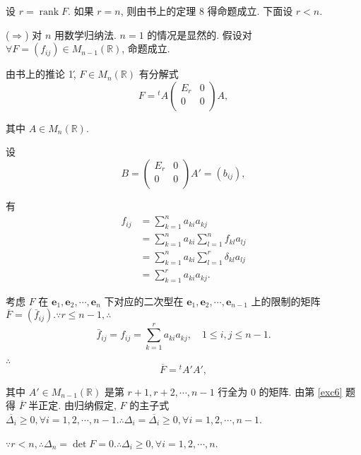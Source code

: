 \documentclass{ctexart}
\begin{document}
\begin{solution}
    设 $r=\operatorname{rank}F$. 如果 $r=n$, 则由书上的定理 8 得命题成立. 下面设 $r<n$.

    ($\Rightarrow$) 对 $n$ 用数学归纳法. $n=1$ 的情况是显然的. 假设对 $\forall F=(f_{ij})\in M_{n-1}(\mathbb{R})$, 命题成立.
    
    由书上的推论 1\', $F\in M_n(\mathbb{R})$ 有分解式
    \[F={}^tA\begin{pmatrix}
        E_r & 0 \\
        0 & 0 \\
    \end{pmatrix}A,\]

    其中 $A\in M_n(\mathbb{R})$.
    
    设
    \[B=\begin{pmatrix}
        E_r & 0 \\
        0 & 0 \\
    \end{pmatrix}A'=(b_{ij}),\]
    
    有
    \begin{align*}
        f_{ij} & =\sum\limits_{k=1}^na_{ki}a_{kj} \\
        & =\sum\limits_{k=1}^na_{ki}\sum\limits_{l=1}^nf_{kl}a_{lj} \\
        & =\sum\limits_{k=1}^na_{ki}\sum\limits_{l=1}^r\delta_{kl}a_{lj} \\
        & =\sum\limits_{k=1}^ra_{ki}a_{kj}.
    \end{align*}

    考虑 $F$ 在 $\boldsymbol{e}_1,\boldsymbol{e}_2,\cdots,\boldsymbol{e}_n$ 下对应的二次型在 $\boldsymbol{e}_1,\boldsymbol{e}_2,\cdots,\boldsymbol{e}_{n-1}$ 上的限制的矩阵 $\overline{F}=(\bar{f}_{ij}).\because r\leq n-1,\therefore$
    \[\bar{f}_{ij}=f_{ij}=\sum\limits_{k=1}^ra_{ki}a_{kj},\quad1\leq i,j\leq n-1.\]

    $\therefore$
    \[\overline{F}={}^tA'A',\]

    其中 $A'\in M_{n-1}(\mathbb{R})$ 是第 $r+1,r+2,\cdots,n-1$ 行全为 $0$ 的矩阵. 由第 \ref{exc6} 题得 $\overline{F}$ 半正定. 由归纳假定, $F$ 的主子式 $\overline{\Delta_i}\geq0,\forall i=1,2,\cdots,n-1.\therefore\Delta_i=\overline{\Delta_i}\geq0,\forall i=1,2,\cdots,n-1$.

    $\because r<n,\therefore\Delta_n=\det F=0.\therefore\Delta_i\geq0,\forall i=1,2,\cdots,n$.

    

\end{solution}
\end{document}
